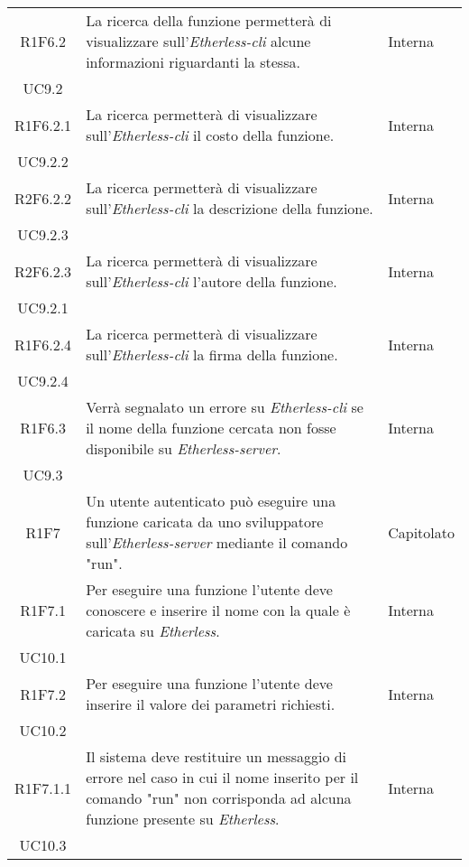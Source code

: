 \begin{longtable}{|c|p{8cm}|C{2cm}|}
	R1F6.2 &  La ricerca della funzione permetterà di visualizzare sull'\textit{Etherless-cli} alcune informazioni riguardanti la stessa.  & \centering Interna \\ UC9.2 \tabularnewline

	R1F6.2.1 &  La ricerca permetterà di visualizzare sull'\textit{Etherless-cli} il costo della funzione.  & \centering Interna \\ UC9.2.2 \tabularnewline

	R2F6.2.2 &  La ricerca permetterà di visualizzare sull'\textit{Etherless-cli} la descrizione della funzione.  & \centering Interna \\ UC9.2.3 \tabularnewline

	R2F6.2.3 &  La ricerca permetterà di visualizzare sull'\textit{Etherless-cli} l'autore della funzione.  & \centering Interna \\ UC9.2.1 \tabularnewline

	R1F6.2.4 &  La ricerca permetterà di visualizzare sull'\textit{Etherless-cli} la firma della funzione.  & \centering Interna \\ UC9.2.4 \tabularnewline

	R1F6.3 &  Verrà segnalato un errore su \textit{Etherless-cli} se il nome della funzione cercata non fosse disponibile su \textit{Etherless-server}.  & \centering Interna \\ UC9.3 \tabularnewline

	R1F7 &  Un utente autenticato può eseguire una funzione caricata da uno sviluppatore sull'\textit{Etherless-server} mediante il comando "run".  & Capitolato \\

	R1F7.1 &  Per eseguire una funzione l'utente deve conoscere e inserire il nome con la quale è caricata su \textit{Etherless}.  & \centering Interna \\ UC10.1 \tabularnewline

	R1F7.2 &  Per eseguire una funzione l'utente deve inserire il valore dei parametri richiesti.  & \centering Interna \\ UC10.2 \tabularnewline

	R1F7.1.1 &  Il sistema deve restituire un messaggio di errore nel caso in cui il nome inserito per il comando "run" non corrisponda ad alcuna funzione presente su \textit{Etherless}.  & \centering Interna \\ UC10.3 \tabularnewline


\end{longtable}
